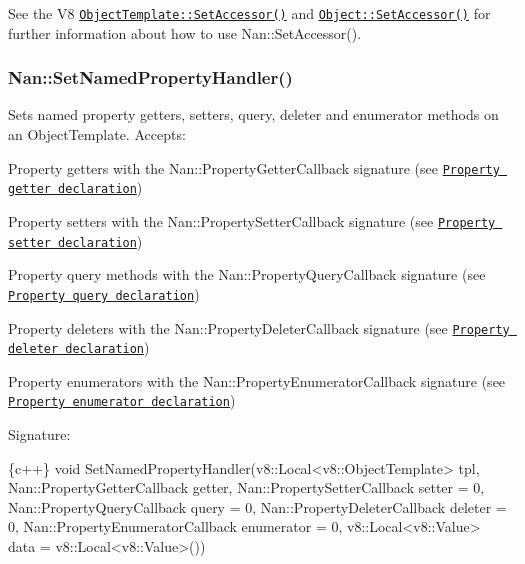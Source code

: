 See the V8 \href{https://v8docs.nodesource.com/io.js-3.0/db/d5f/classv8_1_1_object_template.html#aa90691622f01269c6a11391d372ca0c5}{\tt {\ttfamily Object\+Template\+::\+Set\+Accessor()}} and \href{https://v8docs.nodesource.com/io.js-3.0/db/d85/classv8_1_1_object.html#a3f9dee085f5ec346465f1dc924325043}{\tt {\ttfamily Object\+::\+Set\+Accessor()}} for further information about how to use {\ttfamily Nan\+::\+Set\+Accessor()}.

\label{_api_nan_set_named_property_handler}%
 \subsubsection*{Nan\+::\+Set\+Named\+Property\+Handler()}

Sets named property getters, setters, query, deleter and enumerator methods on an {\ttfamily Object\+Template}. Accepts\+:


\begin{DoxyItemize}
\item Property getters with the {\ttfamily Nan\+::\+Property\+Getter\+Callback} signature (see \href{#api_nan_property_getter}{\tt Property getter declaration})
\item Property setters with the {\ttfamily Nan\+::\+Property\+Setter\+Callback} signature (see \href{#api_nan_property_setter}{\tt Property setter declaration})
\item Property query methods with the {\ttfamily Nan\+::\+Property\+Query\+Callback} signature (see \href{#api_nan_property_query}{\tt Property query declaration})
\item Property deleters with the {\ttfamily Nan\+::\+Property\+Deleter\+Callback} signature (see \href{#api_nan_property_deleter}{\tt Property deleter declaration})
\item Property enumerators with the {\ttfamily Nan\+::\+Property\+Enumerator\+Callback} signature (see \href{#api_nan_property_enumerator}{\tt Property enumerator declaration})
\end{DoxyItemize}

Signature\+:


\begin{DoxyCode}
\{c++\}
void SetNamedPropertyHandler(v8::Local<v8::ObjectTemplate> tpl,
                             Nan::PropertyGetterCallback getter,
                             Nan::PropertySetterCallback setter = 0,
                             Nan::PropertyQueryCallback query = 0,
                             Nan::PropertyDeleterCallback deleter = 0,
                             Nan::PropertyEnumeratorCallback enumerator = 0,
                             v8::Local<v8::Value> data = v8::Local<v8::Value>())
\end{DoxyCode}


